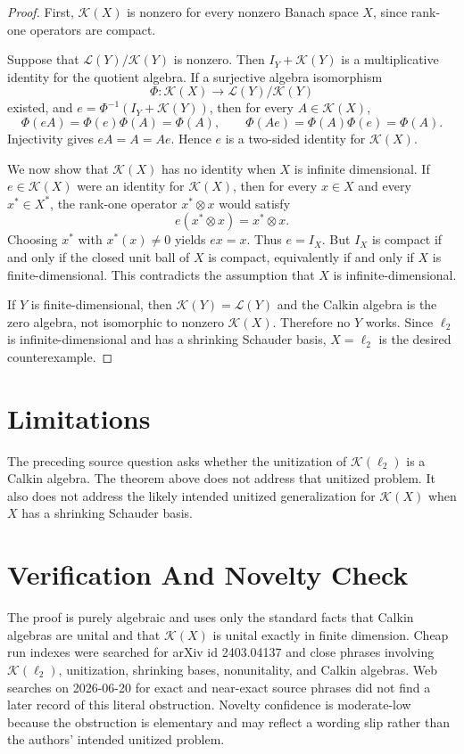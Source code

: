 \documentclass[11pt]{amsart}
\begin{document}
\begin{proof}
First, \(\mathcal K(X)\) is nonzero for every nonzero Banach space \(X\), since
rank-one operators are compact.

Suppose that \(\mathcal L(Y)/\mathcal K(Y)\) is nonzero. Then
\(I_Y+\mathcal K(Y)\) is a multiplicative identity for the quotient algebra.
If a surjective algebra isomorphism
\[
  \Phi:\mathcal K(X)\longrightarrow \mathcal L(Y)/\mathcal K(Y)
\]
existed, and \(e=\Phi^{-1}(I_Y+\mathcal K(Y))\), then for every
\(A\in\mathcal K(X)\),
\[
  \Phi(eA)=\Phi(e)\Phi(A)=\Phi(A),\qquad
  \Phi(Ae)=\Phi(A)\Phi(e)=\Phi(A).
\]
Injectivity gives \(eA=A=Ae\). Hence \(e\) is a two-sided identity for
\(\mathcal K(X)\).

We now show that \(\mathcal K(X)\) has no identity when \(X\) is infinite
dimensional. If \(e\in\mathcal K(X)\) were an identity for \(\mathcal K(X)\),
then for every \(x\in X\) and every \(x^*\in X^*\), the rank-one operator
\(x^*\otimes x\) would satisfy
\[
  e(x^*\otimes x)=x^*\otimes x.
\]
Choosing \(x^*\) with \(x^*(x)\neq 0\) yields \(e x=x\). Thus \(e=I_X\).
But \(I_X\) is compact if and only if the closed unit ball of \(X\) is compact,
equivalently if and only if \(X\) is finite-dimensional. This contradicts the
assumption that \(X\) is infinite-dimensional.

If \(Y\) is finite-dimensional, then \(\mathcal K(Y)=\mathcal L(Y)\) and the
Calkin algebra is the zero algebra, not isomorphic to nonzero \(\mathcal K(X)\).
Therefore no \(Y\) works. Since \(\ell_2\) is infinite-dimensional and has a
shrinking Schauder basis, \(X=\ell_2\) is the desired counterexample.
\end{proof}

\section*{Limitations}

The preceding source question asks whether the unitization of
\(\mathcal K(\ell_2)\) is a Calkin algebra. The theorem above does not address
that unitized problem. It also does not address the likely intended unitized
generalization for \(\mathcal K(X)\) when \(X\) has a shrinking Schauder basis.

\section*{Verification And Novelty Check}

The proof is purely algebraic and uses only the standard facts that Calkin
algebras are unital and that \(\mathcal K(X)\) is unital exactly in finite
dimension. Cheap run indexes were searched for arXiv id 2403.04137 and close
phrases involving \(\mathcal K(\ell_2)\), unitization, shrinking bases,
nonunitality, and Calkin algebras. Web searches on 2026-06-20 for exact and
near-exact source phrases did not find a later record of this literal
obstruction. Novelty confidence is moderate-low because the obstruction is
elementary and may reflect a wording slip rather than the authors' intended
unitized problem.
\end{document}
